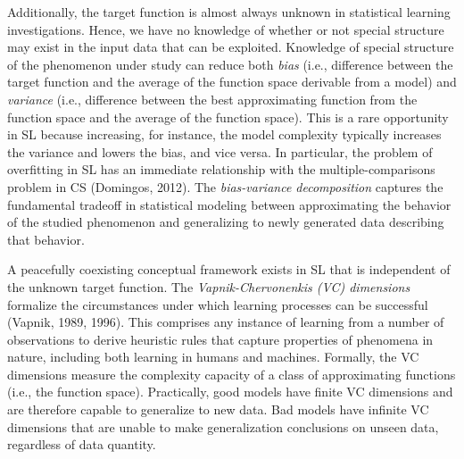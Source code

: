 \documentclass[authoryear,review,3p]{elsarticle}
\begin{document}
Additionally,
the target function is almost always unknown
in statistical learning investigations.
Hence, we have no knowledge of whether or not
special structure may exist in the input data that can be exploited.
%
Knowledge of special structure of the phenomenon under study
can reduce both \textit{bias}
(i.e., difference between the target function and
the average of the function space derivable from a model)
and
\textit{variance}
(i.e., difference between the best approximating function 
from the function space and
the average of the function space).
This is a rare opportunity in SL because increasing,
for instance, the model complexity
typically increases the variance and lowers the bias, and vice versa.
%
In particular,
the problem of overfitting in SL has an immediate relationship
with the multiple-comparisons problem in CS
(Domingos, 2012).
%
The \textit{bias-variance decomposition} captures the fundamental
tradeoff in statistical modeling between
approximating the behavior of
the studied phenomenon and
generalizing to newly generated data describing that behavior. 



A peacefully coexisting conceptual framework exists in SL
that is independent
of the unknown target function.
The \textit{Vapnik-Chervonenkis (VC) dimensions}
formalize the circumstances
under which learning processes can be successful (Vapnik, 1989, 1996).
This comprises any instance of learning
from a number of observations
to derive heuristic rules that capture properties of phenomena in nature,
including both learning in humans and machines.
Formally, the VC dimensions measure the
complexity capacity of a class of approximating functions
(i.e., the function space). 
%
Practically, good models have finite VC dimensions
and are therefore capable to generalize to new data.
Bad models have infinite VC dimensions that
are unable to make generalization conclusions on unseen data,
regardless of data quantity.
\end{document}
